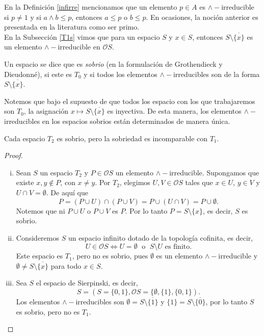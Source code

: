\documentclass{comunicaciones}
\begin{document}
En la Definición \ref{infirre} mencionamos que un elemento $p\in A$ es $\wedge-$irreducible si $p\neq 1$ y si $a\wedge b\leq p$, entonces $a\leq p$ o $b\leq p$. En ocasiones, la noción anterior es presentada en la literatura como ser primo.\\

En la Subsección \ref{T1s} vimos que para un espacio $S$ y $x\in S$, entonces $S\setminus \overline{\{x\}}$ es un elemento $\wedge-$irreducible en $\mathcal{O}S$.

\begin{dfn}
    Un espacio se dice que es \emph{sobrio} (en la formulación de Grothendieck y Dieudonné), si este es $T_0$ y si todos los elementos $\wedge-$irreducibles son de la forma $S\setminus \overline{\{x\}}$.
\end{dfn}

Notemos que bajo el supuesto de que todos los espacio con los que trabajaremos son $T_0$, la asignación $x\mapsto S\setminus \overline{\{x\}}$ es inyectiva. De esta manera, los elementos $\wedge-$irreducibles en los espacios sobrios están determinados de manera única.

\begin{prop}
    Cada espacio $T_2$ es sobrio, pero la sobriedad es incomparable con $T_1$.
\end{prop}

\begin{proof}
    \begin{enumerate}[i)]
        \item Sean $S$ un espacio $T_2$ y $P\in \mathcal{O}S$ un elemento $\wedge-$irreducible. Supongamos que existe $x, y\notin P$, con $x\neq y$. Por $T_2$, elegimos $U, V\in\mathcal{O}S$ tales que $x\in U$, $y\in V$ y $U\cap V=\emptyset$. De aquí que
        \[
        P=(P\cup U)\cap (P\cup V)=P\cup (U\cap V)=P\cup \emptyset.
        \]
        Notemos que ni $P\cup U$ o $P\cup V$ es $P$. Por lo tanto $P=S\setminus \{x\}$, es decir, $S$ es sobrio.
        \item Consideremos $S$ un espacio infinito dotado de la topología cofinita, es decir, 
        \[
        U\in\mathcal{O}S\Leftrightarrow U=\emptyset\; \mbox{ o }\;S\setminus U \mbox{ es finito}.
        \]
        Este espacio es $T_1$, pero no es sobrio, pues $\emptyset$ es un elemento $\wedge-$irreducible y $\emptyset\neq S\setminus \overline{\{x\}}$ para todo $x\in S$.
        \item Sea $S$ el espacio de Sierpinski, es decir,
        \[
        S=(S=\{0,1\},\mathcal{O}S=\{\emptyset,\{1\},\{0,1\}).
        \]
        Los elementos $\wedge-$irreducibles son $\emptyset=S\setminus\overline{\{1\}}$ y $\{1\}=S\setminus \overline{\{0\}}$, por lo tanto $S$ es sobrio, pero no es $T_1$.
    \end{enumerate}
\end{proof}
\end{document}
